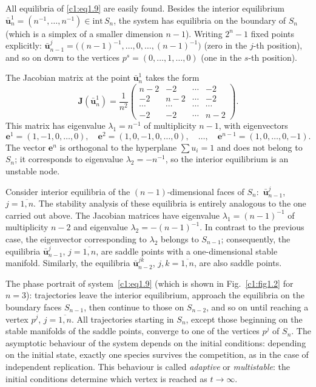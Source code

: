 \documentclass[12pt]{report}
\newcommand{\inside}{\mathrm{int}\,}
\theoremstyle{definition}
\theoremstyle{remark}
\begin{document}
All equilibria of \eqref{c1:eq1.9} are easily found.
Besides the interior equilibrium
$\bar{\mathbf{u}}_{n}^{1}=(n^{-1},\ldots,n^{-1})\in\inside S_{n}$,
the system has equilibria on the boundary of $S_{n}$ (which is a simplex of a smaller dimension $n-1$).
Writing $2^{n}-1$ fixed points explicitly:
$\bar{\mathbf{u}}_{n-1}^{j}=\bigl((n-1)^{-1},\ldots,0,\ldots,(n-1)^{-1}\bigr)$
(zero in the $j$-th position), and so on down to the vertices
$p^{s}=(0,\ldots,1,\ldots,0)$ (one in the $s$-th position).

The Jacobian matrix at the point $\bar{\mathbf{u}}^1_n$ takes the form
\[
  \mathbf{J}\!\left(\bar{\mathbf{u}}^1_n\right)
  = \frac{1}{n^2}
  \begin{pmatrix}
    n-2 & -2   & \cdots & -2   \\
    -2   & n-2 & \cdots & -2   \\
    \cdots & \cdots & \cdots & \cdots \\
    -2   & -2   & \cdots & n-2
  \end{pmatrix}.
\]
This matrix has eigenvalue $\lambda_1 = n^{-1}$ of multiplicity 
$n-1$, with eigenvectors
\[
\mathbf{e}^1 = (1,-1,0,\ldots,0),\quad
\mathbf{e}^2 = (1,0,-1,0,\ldots,0),\quad\ldots,\quad
\mathbf{e}^{n-1} = (1,0,\ldots,0,-1).
\]
The vector $\mathbf{e}^{n}$ is orthogonal to the hyperplane
$\sum u_{i}=1$ and does not belong to $S_{n}$; it corresponds to
eigenvalue $\lambda_{2}=-n^{-1}$, so the interior equilibrium is an
unstable node.


Consider  interior equilibria of the $(n-1)$-dimensional faces of $S_n:$ $\bar{\mathbf{u}}^{j}_{n-1}$, $j=\overline{1,n}$.
The stability analysis of these equilibria is entirely analogous to the
one carried out above. The Jacobian matrices have eigenvalue
$\lambda_1 = (n-1)^{-1}$ of multiplicity $n-2$ and eigenvalue
$\lambda_2 = -(n-1)^{-1}$. In contrast to the previous case, the
eigenvector corresponding to $\lambda_2$ belongs to $S_{n-1}$;
consequently, the equilibria $\bar{\mathbf{u}}^{j}_{n-1}$,
$j = \overline{1,n}$, are saddle points with a one-dimensional stable
manifold.  Similarly, the equilibria $\bar{\mathbf{u}}^{jk}_{n-2}$,
$j, k = \overline{1,n}$, are also saddle points.

The phase portrait of system~\eqref{c1:eq1.9} (which is shown in
Fig.~\ref{c1:fig1.2} for $n=3$): trajectories leave the interior equilibrium,
approach the equilibria on the boundary faces $S_{n-1}$, then
continue to those on $S_{n-2}$, and so on until reaching a vertex
$p^{j}$, $j=\overline{1,n}$. All trajectories starting in $S_n$,
except those beginning on the stable manifolds of the saddle points,
converge to one of the vertices $p^{j}$ of $S_n$. The asymptotic
behaviour of the system depends on the initial conditions: depending
on the initial state, exactly one species survives the competition,
as in the case of independent replication. This behaviour is called
\emph{adaptive} or \emph{multistable}: the initial conditions
determine which vertex is reached as $t\to\infty$.
\end{document}
